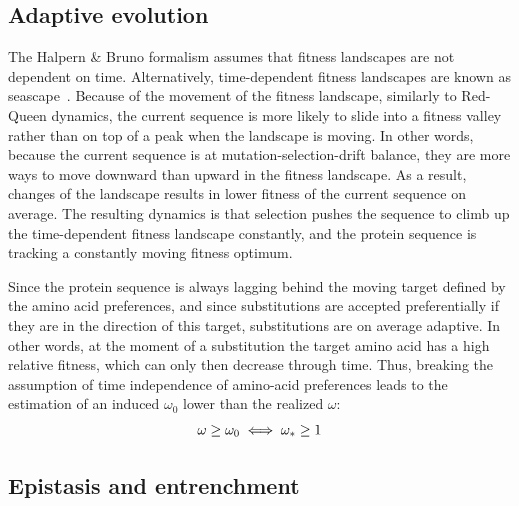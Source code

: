 \subsection{Adaptive evolution}
\label{subsec:adaptive-evolution}

The Halpern \& Bruno formalism assumes that fitness landscapes are not dependent on time.
Alternatively, time-dependent fitness landscapes are known as seascape~\citep{Mustonen2009}.
Because of the movement of the fitness landscape, similarly to Red-Queen dynamics, the current sequence is more likely to slide into a fitness valley rather than on top of a peak when the landscape is moving.
In other words, because the current sequence is at mutation-selection-drift balance, they are more ways to move downward than upward in the fitness landscape.
As a result, changes of the landscape results in lower fitness of the current sequence on average.
The resulting dynamics is that selection pushes the sequence to climb up the time-dependent fitness landscape constantly, and the protein sequence is tracking a constantly moving fitness optimum.

Since the protein sequence is always lagging behind the moving target defined by the amino acid preferences, and since \glspl{substitution} are accepted preferentially if they are in the direction of this target, \glspl{substitution} are on average adaptive.
In other words, at the moment of a \gls{substitution} the target amino acid has a high relative fitness, which can only then decrease through time.
Thus, breaking the assumption of time independence of amino-acid preferences leads to the estimation of an induced $\omega_0$ lower than the realized $\omega$:
\begin{equation}
    \omega \geq \omega_0 \\
    \iff \omega_* \geq 1
\end{equation}

\subsection{Epistasis and entrenchment}
\label{subsec:epistasis-and-entrenchment}

